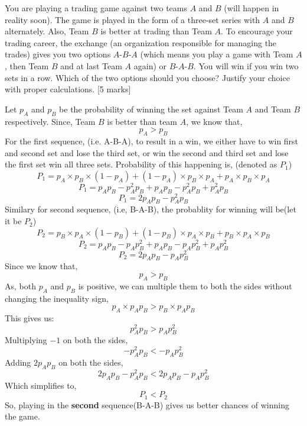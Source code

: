 
\begin{que}
	You are playing a trading game against two teams $A$ and $B$ (will happen
	in reality soon). The game is played in the form of a three-set series
	with $A$ and $B$ alternately. Also, Team $B$ is better at trading than Team
	$A$. To encourage your trading career, the exchange (an organization
	responsible for managing the trades) gives you two options $A$-$B$-$A$ (which
	means you play a game with Team $A$, then Team $B$ and at last Team $A$
	again) or $B$-$A$-$B$. You will win if you win two sets in a row. Which of
	the two options should you choose? Justify your choice with proper
	calculations.
	\hspace*{\fill} [5 marks]
\end{que}

\begin{tcolorbox}[breakable]
	\begin{sol}
		Let $p_A$ and $p_B$ be the probability of winning the set against Team $A$ and Team $B$ respectively. Since, Team $B$ is better than team $A$, we know that,
        \[p_A>p_B\]
        For the first sequence, (i.e. A-B-A), to result in a win, we either have to win first and second set and lose the third set, or win the second and third set and lose the first set win all three sets. Probability of this happening is, (denoted as $P_1$)
        \[P_1=p_A\times p_B \times (1-p_A)+(1-p_A)\times p_B\times p_A +p_A\times p_B\times p_A\]
        \[P_1=p_Ap_B-p_A^2p_B+p_Ap_B-p_A^2p_B+p_A^2p_B\]
        \[P_1=2p_Ap_B-p_A^2p_B\]
        Similary for second sequence, (i.e, B-A-B), the probablity for winning will be(let it be $P_2$)
        \[P_2=p_B\times p_A \times (1-p_B)+(1-p_B)\times p_A\times p_B +p_B\times p_A\times p_B\]
        \[P_2=p_Ap_B-p_Ap_B^2+p_Ap_B-p_Ap_B^2+p_Ap_B^2\]
        \[P_2=2p_Ap_B-p_Ap_B^2\]
        Since we know that,
        \[p_A>p_B\]
        As, both $p_A$ and $p_B$ is positive, we can multiple them to both the sides without changing the inequality sign,
        \[p_A\times p_Ap_B > p_B\times p_Ap_B\]
        This gives us:
        \[p_A^2p_B > p_Ap_B^2\]
        Multiplying $-1$ on both the sides,
        \[-p_A^2p_B < -p_Ap_B^2\]
        Adding $2p_Ap_B$ on both the sides,
        \[ 2p_Ap_B-p_A^2p_B < 2p_Ap_B-p_Ap_B^2\]
        Which simplifies to,
        \[P_1 < P_2\]
        So, playing in the \textbf{second} sequence(B-A-B) gives us better chances of winning the game.
	\end{sol}
\end{tcolorbox}
